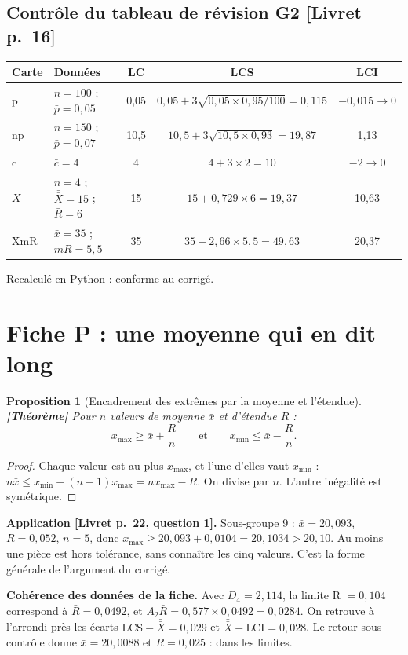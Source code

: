 \documentclass[11pt,a4paper]{article}
\theoremstyle{tq}
\newtheorem{prop}{Proposition}
\theoremstyle{remark}
\newcommand{\thm}{\textcolor{vertTQ}{\textbf{[Théorème]}}}
\newcommand{\liv}[1]{\textcolor{uimmblue}{\small[Livret p.~#1]}}
\newcommand{\Xbb}{\bar{\bar{X}}}
\newcommand{\Rb}{\bar{R}}
\newcommand{\mRb}{\overline{mR}}
\begin{document}
\subsection{Contrôle du tableau de révision G2 \liv{16}}
\begin{center}\small
\begin{tabular}{@{}llccc@{}}
\toprule
Carte & Données & LC & LCS & LCI\\
\midrule
p & $n=100$ ; $\bar p=0{,}05$ & 0,05 & $0{,}05+3\sqrt{0{,}05\times0{,}95/100}=0{,}115$ & $-0{,}015\to0$\\
np & $n=150$ ; $\bar p=0{,}07$ & 10,5 & $10{,}5+3\sqrt{10{,}5\times0{,}93}=19{,}87$ & 1,13\\
c & $\bar c=4$ & 4 & $4+3\times2=10$ & $-2\to0$\\
$\bar X$ & $n=4$ ; $\Xbb=15$ ; $\Rb=6$ & 15 & $15+0{,}729\times6=19{,}37$ & 10,63\\
XmR & $\bar x=35$ ; $\mRb=5{,}5$ & 35 & $35+2{,}66\times5{,}5=49{,}63$ & 20,37\\
\bottomrule
\end{tabular}
\end{center}
Recalculé en Python : conforme au corrigé.

\section{Fiche P : une moyenne qui en dit long}\label{sec:P}

\begin{prop}[Encadrement des extrêmes par la moyenne et l'étendue]\thm{}
Pour $n$ valeurs de moyenne $\bar x$ et d'étendue $R$ :
\[
x_{\max}\ge\bar x+\frac Rn\qquad\text{et}\qquad x_{\min}\le\bar x-\frac Rn .
\]
\end{prop}
\begin{proof}
Chaque valeur est au plus $x_{\max}$, et l'une d'elles vaut $x_{\min}$ : $n\bar x\le x_{\min}+(n-1)x_{\max}=nx_{\max}-R$. On divise par $n$. L'autre inégalité est symétrique.
\end{proof}
\textbf{Application \liv{22, question 1}.} Sous-groupe 9 : $\bar x=20{,}093$, $R=0{,}052$, $n=5$, donc $x_{\max}\ge20{,}093+0{,}0104=20{,}1034>20{,}10$. Au moins une pièce est hors tolérance, sans connaître les cinq valeurs. C'est la forme générale de l'argument du corrigé.

\textbf{Cohérence des données de la fiche.} Avec $D_4=2{,}114$, la limite R $=0{,}104$ correspond à $\Rb=0{,}0492$, et $A_2\Rb=0{,}577\times0{,}0492=0{,}0284$. On retrouve à l'arrondi près les écarts $\text{LCS}-\Xbb=0{,}029$ et $\Xbb-\text{LCI}=0{,}028$. Le retour sous contrôle donne $\bar x=20{,}0088$ et $R=0{,}025$ : dans les limites.
\end{document}
